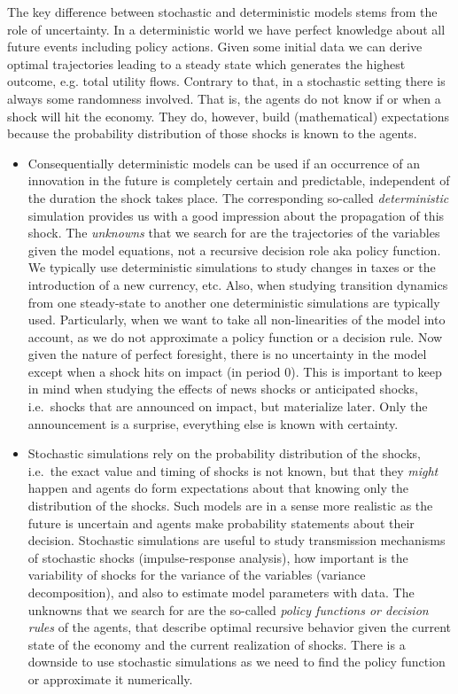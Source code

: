 The key difference between stochastic and deterministic models stems from the role of uncertainty.
  In a deterministic world we have perfect knowledge about all future events including policy actions.
Given some initial data we can derive optimal trajectories leading to a steady state which generates the highest outcome, e.g. total utility flows.
Contrary to that, in a stochastic setting there is always some randomness involved.
That is, the agents do not know if or when a shock will hit the economy.
They do, however, build (mathematical) expectations because the probability distribution of those shocks is known to the agents.
\begin{itemize}
\item     
Consequentially deterministic models can be used if an occurrence of an innovation in the future is completely certain and predictable,
  independent of the duration the shock takes place.
The corresponding so-called \emph{deterministic} simulation provides us with a good impression about the propagation of this shock.
The \emph{unknowns} that we search for are the trajectories of the variables given the model equations,
  not a recursive decision role aka policy function.
We typically use deterministic simulations to study changes in taxes
  or the introduction of a new currency, etc.
Also, when studying transition dynamics from one steady-state to another one deterministic simulations are typically used.
Particularly, when we want to take all non-linearities of the model into account,
  as we do not approximate a policy function or a decision rule.
Now given the nature of perfect foresight,
  there is no uncertainty in the model except when a shock hits on impact (in period 0).
This is important to keep in mind when studying the effects of news shocks or anticipated shocks,
  i.e.\ shocks that are announced on impact, but materialize later.
Only the announcement is a surprise,
  everything else is known with certainty.

\item  
Stochastic simulations rely on the probability distribution of the shocks,
  i.e.\ the exact value and timing of shocks is not known,
  but that they \emph{might} happen and agents do form expectations about that knowing only the distribution of the shocks.
Such models are in a sense more realistic as the future is uncertain
  and agents make probability statements about their decision.
Stochastic simulations are useful to study transmission mechanisms of stochastic shocks (impulse-response analysis),
  how important is the variability of shocks for the variance of the variables (variance decomposition),
  and also to estimate model parameters with data.
The unknowns that we search for are the so-called \emph{policy functions or decision rules} of the agents,
  that describe optimal recursive behavior given the current state of the economy and the current realization of shocks.
There is a downside to use stochastic simulations
  as we need to find the policy function or approximate it numerically.

\end{itemize}